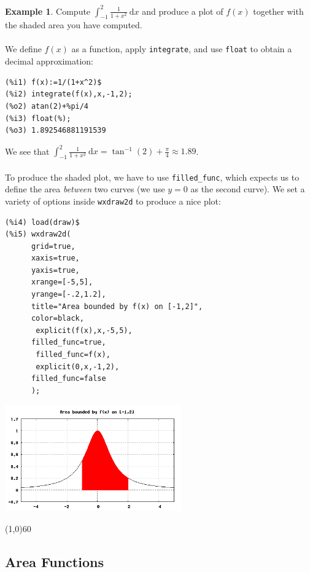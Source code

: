 \documentclass[10.5pt,twoside]{report}
\theoremstyle{definition}
\newtheorem{exmp}{Example}[section]
\begin{document}
\begin{exmp} Compute $\displaystyle \int_{-1}^{2} \frac{1}{1+x^2} \ \mathrm{d}x$ and produce a plot of $f(x)$ together with the shaded area you have computed.\\
${}$\\

We define $f(x)$ as a function, apply \verb|integrate|, and use \verb|float| to obtain a decimal approximation:

\begin{verbatim}
(%i1) f(x):=1/(1+x^2)$
(%i2) integrate(f(x),x,-1,2);
(%o2) atan(2)+%pi/4
(%i3) float(%);
(%o3) 1.892546881191539
\end{verbatim}

We see that $\displaystyle \int_{-1}^{2} \frac{1}{1+x^2} \ \mathrm{d}x = \tan^{-1}(2) + \frac{\pi}{4} \approx 1.89$.\\
${}$\\

To produce the shaded plot, we have to use \verb|filled_func|, which expects us to define the area \textit{between} two curves (we use $y=0$ as the second curve).  We set a variety of options inside \verb|wxdraw2d| to produce a nice plot:

\begin{verbatim}
(%i4) load(draw)$
(%i5) wxdraw2d(
      grid=true,
      xaxis=true,
      yaxis=true,
      xrange=[-5,5],
      yrange=[-.2,1.2],
      title="Area bounded by f(x) on [-1,2]",
      color=black,
       explicit(f(x),x,-5,5),
      filled_func=true,
       filled_func=f(x),
       explicit(0,x,-1,2),
      filled_func=false
      ); 
\end{verbatim}

\includegraphics[width=3in]{example_1_1_1_1}

\end{exmp}

\line(1,0){60}
\linethickness{0.5mm}


\subsection{Area Functions}
\end{document}
